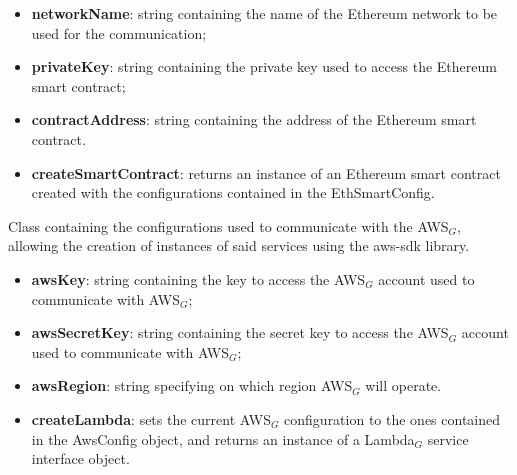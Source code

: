	\begin{itemize}
		\item \textbf{networkName}: string containing the name of the Ethereum network to be used for the communication;
		\item \textbf{privateKey}: string containing the private key used to access the Ethereum smart contract;
		\item \textbf{contractAddress}: string containing the address of the Ethereum smart contract.
	\end{itemize}
	\begin{itemize}
		\item \textbf{createSmartContract}: returns an instance of an Ethereum smart contract created with the configurations contained in the EthSmartConfig.
	\end{itemize}
	Class containing the configurations used to communicate with the AWS$_{G}$, allowing the creation of instances of said services using the aws-sdk library.
	\begin{itemize}
		\item \textbf{awsKey}: string containing the key to access the AWS$_{G}$ account used to communicate with AWS$_{G}$;
		\item \textbf{awsSecretKey}: string containing the secret key to access the AWS$_{G}$ account used to communicate with AWS$_{G}$;
		\item \textbf{awsRegion}: string specifying on which region AWS$_{G}$ will operate.
	\end{itemize}
	\begin{itemize}
		\item \textbf{createLambda}: sets the current AWS$_{G}$ configuration to the ones contained in the AwsConfig object, and returns an instance of a Lambda$_{G}$ service interface object.
	\end{itemize}
